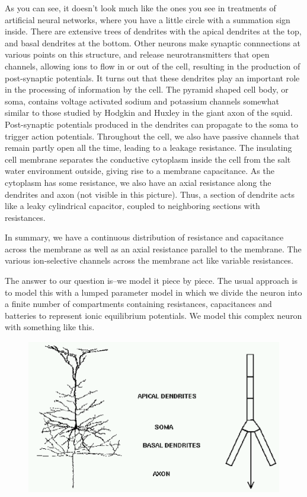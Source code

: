 \documentclass[12pt]{article}
\begin{document}
As you can see, it doesn't look much like the ones you see in treatments of artificial neural networks, where you have a little circle with a summation sign inside. There are extensive trees of dendrites with the apical dendrites at the top, and basal dendrites at the bottom. Other neurons make synaptic connnections at various points on this structure, and release neurotransmitters that open channels, allowing ions to flow in or out of the cell, resulting in the production of post-synaptic potentials. It turns out that these dendrites play an important role in the processing of information by the cell. The pyramid shaped cell body, or soma, contains voltage activated sodium and potassium channels somewhat similar to those studied by Hodgkin and Huxley in the giant axon of the squid. Post-synaptic potentials produced in the dendrites can propagate to the soma to trigger action potentials. Throughout the cell, we also have passive channels that remain partly open all the time, leading to a leakage resistance. The insulating cell membrane separates the conductive cytoplasm inside the cell from the salt water environment outside, giving rise to a membrane capacitance. As the cytoplasm has some resistance, we also have an axial resistance along the dendrites and axon (not visible in this picture). Thus, a section of dendrite acts like a leaky cylindrical capacitor, coupled to neighboring sections with resistances.

In summary, we have a continuous distribution of resistance and capacitance across the membrane as well as an axial resistance parallel to the membrane. The various ion-selective channels across the membrane act like variable resistances.

The answer to our question is--we model it piece by piece. The usual approach is to model this with a lumped parameter model in which we divide the neuron into a finite number of compartments containing resistances, capacitances and batteries to represent ionic equilibrium potentials. We model this complex neuron with something like this.

\begin{figure}[h]
  \centering
 \includegraphics[scale=0.5]{figures/compartments.eps}
  \label{fig:compartments}
\end{figure}
\end{document}
